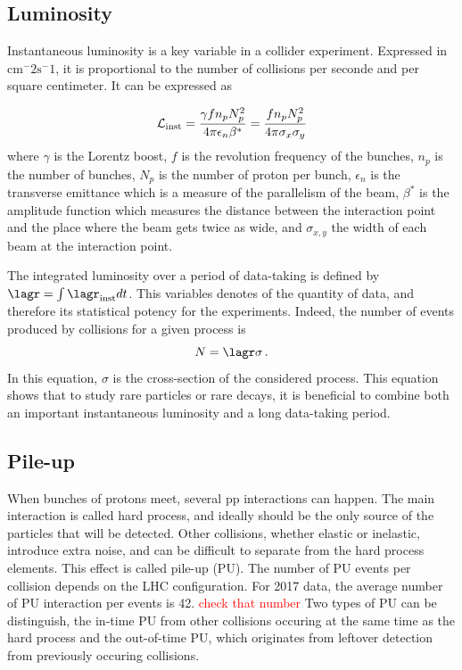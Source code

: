 \subsection{Luminosity}

Instantaneous luminosity is a key variable in a collider experiment. Expressed in $\mathrm{cm^-2 s^-1}$, it is proportional to the number of collisions per seconde and per square centimeter. It can be expressed as

\begin{equation}
    \mathcal{L}_{\rm{inst}} = \frac{\gamma f n_p N_p^2}{4\pi \epsilon_n \beta^{*}} = \frac{f n_p N_p^2}{4\pi \sigma_x \sigma_y}
\end{equation}
where $\gamma$ is the Lorentz boost, $f$ is the revolution frequency of the bunches, $n_p$ is the number of bunches, $N_p$ is the number of proton per bunch, $\epsilon_n$ is the transverse emittance which is a measure of the parallelism of the beam, $\beta^*$ is the amplitude function which measures the distance between the interaction point and the place where the beam gets twice as wide, and $\sigma_{x,y}$ the width of each beam at the interaction point.

The integrated luminosity over a period of data-taking is defined by $\lagr = \int \lagr_{\rm{inst}} dt$. This variables denotes of the quantity of data, and therefore its statistical potency for the experiments. Indeed, the number of events produced by collisions for a given process is 
\begin{equation}
    N = \lagr\sigma \mend
\end{equation}
In this equation, $\sigma$ is the cross-section of the considered process. This equation shows that to study rare particles or rare decays, it is beneficial to combine both an important instantaneous luminosity and a long data-taking period.

\subsection{Pile-up}

When bunches of protons meet, several pp interactions can happen. The main interaction is called hard process, and ideally should be the only source of the particles that will be detected. Other collisions, whether elastic or inelastic, introduce extra noise, and can be difficult to separate from the hard process elements. This effect is called pile-up (PU). The number of PU events per collision depends on the LHC configuration. For 2017 data, the average number of PU interaction per events is 42. \textcolor{red}{check that number} Two types of PU can be distinguish, the in-time PU from other collisions occuring at the same time as the hard process and the out-of-time PU, which originates from leftover detection from previously occuring collisions.

